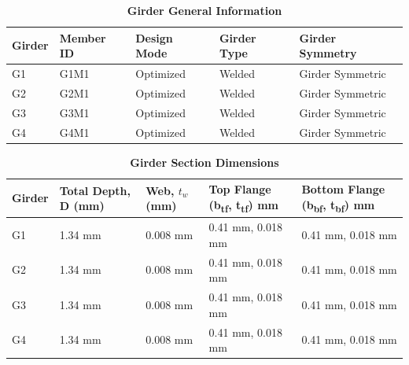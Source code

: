 \documentclass[12pt,a4paper]{report}
\numberwithin{table}{chapter}
\numberwithin{figure}{chapter}
\begin{document}
\newpage

\vspace{0.4em}
\noindent
            
\vspace{4pt}
\begin{longtable}{|L{2.2cm}|L{1.8cm}|p{3.8cm}|p{3.8cm}|p{3.8cm}|}
\caption{\textbf{Girder General Information}}
\hline
\textbf{Girder} & \textbf{Member ID} & \textbf{Design Mode} & \textbf{Girder Type} & \textbf{Girder Symmetry} \\[6pt]
\hline
G1 & G1M1 & Optimized & Welded & Girder Symmetric \\[8pt]
\hline
G2 & G2M1 & Optimized & Welded & Girder Symmetric \\[8pt]
\hline
G3 & G3M1 & Optimized & Welded & Girder Symmetric \\[8pt]
\hline
G4 & G4M1 & Optimized & Welded & Girder Symmetric \\[8pt]
\hline
\end{longtable}

\vspace{0.6em}

\vspace{4pt}
\begin{longtable}{|L{1.8cm}|L{2.3cm}|L{1.8cm}|p{4.8cm}|p{4.8cm}|}
\caption{\textbf{Girder Section Dimensions}}
\hline
\textbf{Girder} & \textbf{Total Depth, D (mm)} & \textbf{Web, $t_w$ (mm)} & \textbf{Top Flange (b\textsubscript{tf}, t\textsubscript{tf}) mm} & \textbf{Bottom Flange (b\textsubscript{bf}, t\textsubscript{bf}) mm} \\[6pt]
\hline
G1 & 1.34 mm & 0.008 mm & 0.41 mm, 0.018 mm & 0.41 mm, 0.018 mm \\[8pt]
\hline
G2 & 1.34 mm & 0.008 mm & 0.41 mm, 0.018 mm & 0.41 mm, 0.018 mm \\[8pt]
\hline
G3 & 1.34 mm & 0.008 mm & 0.41 mm, 0.018 mm & 0.41 mm, 0.018 mm \\[8pt]
\hline
G4 & 1.34 mm & 0.008 mm & 0.41 mm, 0.018 mm & 0.41 mm, 0.018 mm \\[8pt]
\hline
\end{longtable}

\vspace{0.6em}
\end{document}

